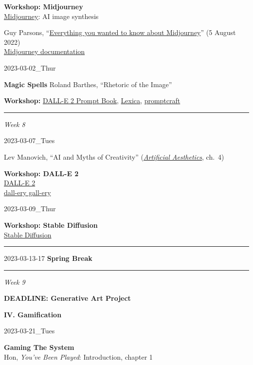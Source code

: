 \documentclass[
  letterpaper,
  DIV=11,
  numbers=noendperiod]{scrartcl}
\begin{document}
\textbf{Workshop: Midjourney}\\
\href{https://www.midjourney.com/}{Midjourney}: AI image synthesis

Guy Parsons,
``\href{https://dallery.gallery/midjourney-guide-ai-art-explained/}{Everything
you wanted to know about Midjourney}'' (5 August 2022)\\
\href{https://midjourney.gitbook.io/docs/}{Midjourney documentation}

2023-03-02\_Thur

\textbf{Magic Spells} Roland Barthes, ``Rhetoric of the Image''

\textbf{Workshop:}
\href{https://canvas.emerson.edu/courses/1932613/files/144544393?wrap=1}{DALL-E
2 Prompt Book}, \href{https://lexica.art/}{Lexica},
\href{https://www.reddit.com/r/promptcraft/}{promptcraft}

\begin{center}\rule{0.5\linewidth}{0.5pt}\end{center}

\emph{Week 8}

2023-03-07\_Tues

Lev Manovich, ``AI and Myths of Creativity''
(\href{http://manovich.net/index.php/projects/artificial-aesthetics-book}{\emph{Artificial
Aesthetics}}, ch.~4)

\textbf{Workshop: DALL-E 2}\\
\href{https://openai.com/dall-e-2/}{DALL-E 2}\\
\href{https://dallery.gallery/}{dall-ery gall-ery}

2023-03-09\_Thur

\textbf{Workshop: Stable Diffusion}\\
\href{https://stablediffusionweb.com/}{Stable Diffusion}

\begin{center}\rule{0.5\linewidth}{0.5pt}\end{center}

2023-03-13-17 \textbf{Spring Break}

\begin{center}\rule{0.5\linewidth}{0.5pt}\end{center}

\emph{Week 9}

\textbf{DEADLINE: Generative Art Project}

\textbf{IV. Gamification}

2023-03-21\_Tues

\textbf{Gaming The System}\\
Hon, \emph{You've Been Played}: Introduction, chapter 1
\end{document}
